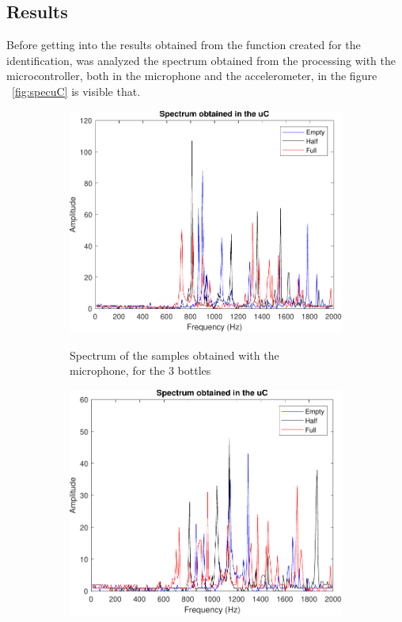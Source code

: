 \subsection{Results}
Before getting into the results obtained from the function created for the identification, was analyzed the spectrum obtained from the processing with the microcontroller, both in the microphone and the accelerometer, in the figure ~\ref{fig:specuC} is visible that.
\begin{figure}[]
    \centering
    \begin{subfigure}{0.45\textwidth}
        \centering
        \includegraphics[width=\linewidth]{Chapters/6CHP/Figures/ResultsuCGraphs/specMICuC.pdf}
        \caption{Spectrum of the samples obtained with the microphone, for the 3 bottles}{}
        \label{subfig:specMICuc}
    \end{subfigure}
    \begin{subfigure}{0.45\textwidth}
        \centering
        \includegraphics[width=\linewidth]{Chapters/6CHP/Figures/ResultsuCGraphs/uCGraphsSen.pdf}

\end{subfigure}
\end{figure}
